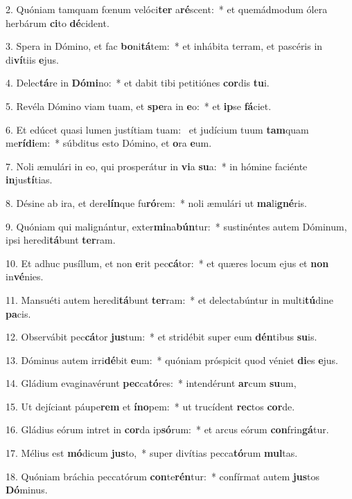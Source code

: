 2. Quóniam tamquam fœnum velóci\textbf{ter} a\textbf{ré}scent:~*  et quemádmodum ólera herbárum \textbf{ci}to \textbf{dé}cident.\

3. Spera in Dómino, et fac \textbf{bo}ni\textbf{tá}tem:~*  et inhábita terram, et pascéris in di\textbf{ví}tiis \textbf{e}jus.\

4. Delec\textbf{tá}re in \textbf{Dó}\textbf{mi}no:~*  et dabit tibi petitiónes \textbf{cor}dis \textbf{tu}i.\

5. Revéla Dómino viam tuam, et \textbf{spe}ra in \textbf{e}o:~*  et \textbf{ip}se \textbf{fá}ciet.\

6. Et edúcet quasi lumen justítiam tuam: \dag\  et judícium tuum \textbf{tam}quam me\textbf{rí}\textbf{di}em:~*  súbditus esto Dómino, et \textbf{o}ra \textbf{e}um.\

7. Noli æmulári in eo, qui prosperátur in \textbf{vi}a \textbf{su}a:~*  in hómine faciénte \textbf{in}jus\textbf{tí}tias.\

8. Désine ab ira, et dere\textbf{lín}que fu\textbf{ró}rem:~*  noli æmulári ut \textbf{ma}li\textbf{gné}ris.\

9. Quóniam qui malignántur, exter\textbf{mi}na\textbf{bún}tur:~*  sustinéntes autem Dóminum, ipsi heredi\textbf{tá}bunt \textbf{ter}ram.\

10. Et adhuc pusíllum, et non \textbf{e}rit pec\textbf{cá}tor:~*  et quæres locum ejus et \textbf{non} in\textbf{vé}nies.\

11. Mansuéti autem heredi\textbf{tá}bunt \textbf{ter}ram:~*  et delectabúntur in multi\textbf{tú}dine \textbf{pa}cis.\

12. Observábit pec\textbf{cá}tor \textbf{jus}tum:~*  et stridébit super eum \textbf{dén}tibus \textbf{su}is.\

13. Dóminus autem irri\textbf{dé}bit \textbf{e}um:~*  quóniam próspicit quod véniet \textbf{di}es \textbf{e}jus.\

14. Gládium evaginavérunt \textbf{pec}ca\textbf{tó}res:~*  intendérunt \textbf{ar}cum \textbf{su}um,\

15. Ut dejíciant páupe\textbf{rem} et \textbf{ín}\textbf{o}pem:~*  ut trucídent \textbf{rec}tos \textbf{cor}de.\

16. Gládius eórum intret in \textbf{cor}da ip\textbf{só}rum:~*  et arcus eórum \textbf{con}frin\textbf{gá}tur.\

17. Mélius est \textbf{mó}dicum \textbf{jus}to,~*  super divítias pecca\textbf{tó}rum \textbf{mul}tas.\

18. Quóniam bráchia peccatórum \textbf{con}te\textbf{rén}tur:~*  confírmat autem \textbf{jus}tos \textbf{Dó}minus.\


